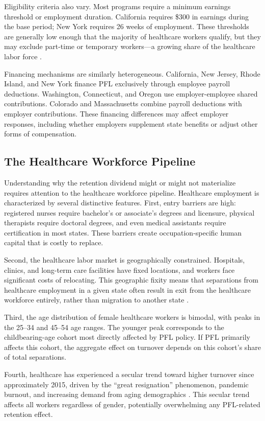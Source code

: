 \documentclass[12pt]{article}
\begin{document}
Eligibility criteria also vary. Most programs require a minimum earnings threshold or employment duration. California requires \$300 in earnings during the base period; New York requires 26 weeks of employment. These thresholds are generally low enough that the majority of healthcare workers qualify, but they may exclude part-time or temporary workers---a growing share of the healthcare labor force \citep{bls2024}.

Financing mechanisms are similarly heterogeneous. California, New Jersey, Rhode Island, and New York finance PFL exclusively through employee payroll deductions. Washington, Connecticut, and Oregon use employer-employee shared contributions. Colorado and Massachusetts combine payroll deductions with employer contributions. These financing differences may affect employer responses, including whether employers supplement state benefits or adjust other forms of compensation.

\subsection{The Healthcare Workforce Pipeline}

Understanding why the retention dividend might or might not materialize requires attention to the healthcare workforce pipeline. Healthcare employment is characterized by several distinctive features. First, entry barriers are high: registered nurses require bachelor's or associate's degrees and licensure, physical therapists require doctoral degrees, and even medical assistants require certification in most states. These barriers create occupation-specific human capital that is costly to replace.

Second, the healthcare labor market is geographically constrained. Hospitals, clinics, and long-term care facilities have fixed locations, and workers face significant costs of relocating. This geographic fixity means that separations from healthcare employment in a given state often result in exit from the healthcare workforce entirely, rather than migration to another state \citep{aiken2002}.

Third, the age distribution of female healthcare workers is bimodal, with peaks in the 25--34 and 45--54 age ranges. The younger peak corresponds to the childbearing-age cohort most directly affected by PFL policy. If PFL primarily affects this cohort, the aggregate effect on turnover depends on this cohort's share of total separations.

Fourth, healthcare has experienced a secular trend toward higher turnover since approximately 2015, driven by the ``great resignation'' phenomenon, pandemic burnout, and increasing demand from aging demographics \citep{nsi2024}. This secular trend affects all workers regardless of gender, potentially overwhelming any PFL-related retention effect.
\end{document}
